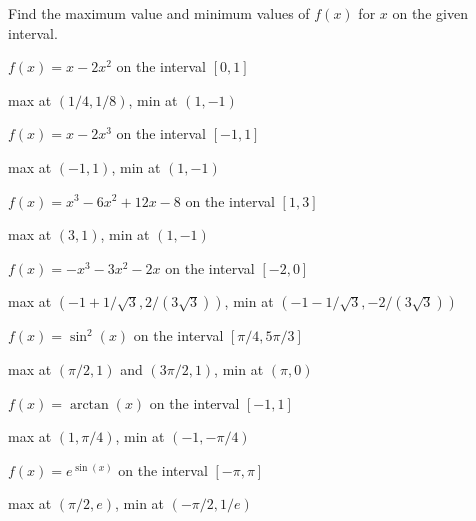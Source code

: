 \begin{exercises}
\noindent Find the maximum value and minimum values of $f(x)$ for $x$
on the given interval.

\begin{exercise}
$f(x) = x-2x^2$ on the interval $[0,1]$
\begin{answer}
max at $(1/4,1/8)$, min at $(1,-1)$
\end{answer}
\end{exercise}

\begin{exercise}
$f(x) = x-2x^3$ on the interval $[-1,1]$
\begin{answer}
max at $(-1,1)$, min at $(1,-1)$
\end{answer}
\end{exercise}

\begin{exercise}
$f(x) = x^3-6x^2+12x-8$ on the interval $[1,3]$
\begin{answer}
max at $(3,1)$, min at $(1,-1)$
\end{answer}
\end{exercise}

\begin{exercise}
$f(x) = -x^3-3x^2-2x$ on the interval $[-2,0]$
\begin{answer}
max at $(-1+1/\sqrt{3},2/(3\sqrt{3}))$, min at
$(-1-1/\sqrt{3},-2/(3\sqrt{3}))$
\end{answer}
\end{exercise}

\begin{exercise}
$f(x) = \sin^2(x)$ on the interval $[\pi/4,5\pi/3]$
\begin{answer}
max at $(\pi/2,1)$ and $(3\pi/2,1)$, min at $(\pi,0)$
\end{answer}
\end{exercise}

\begin{exercise}
$f(x) = \arctan(x)$ on the interval $[-1,1]$
\begin{answer}
max at $(1,\pi/4)$, min at
$(-1,-\pi/4)$
\end{answer}
\end{exercise}

\begin{exercise}
$f(x) = e^{\sin(x)}$ on the interval $[-\pi,\pi]$
\begin{answer}
max at $(\pi/2,e)$, min at
$(-\pi/2,1/e)$
\end{answer}
\end{exercise}


\end{exercises}
